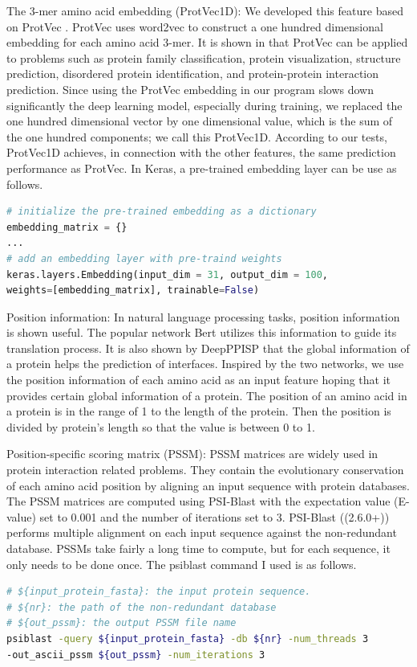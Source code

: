 The 3-mer amino acid embedding (ProtVec1D): We developed this feature based on ProtVec \cite{asgari2015continuous}. ProtVec uses word2vec \cite{mikolov2013distributed} to construct a one hundred dimensional embedding for each amino acid 3-mer. It is shown in \cite{asgari2015continuous} that ProtVec can be applied to problems such as protein family classification, protein visualization, structure prediction, disordered protein identification, and protein-protein interaction prediction. Since using the ProtVec embedding in our program slows down significantly the deep learning model, especially during training, we replaced the one hundred dimensional vector by one dimensional value, which is the sum of the one hundred components; we call this ProtVec1D. According to our tests, ProtVec1D achieves, in connection with the other features, the same prediction performance as ProtVec. In Keras, a pre-trained embedding layer can be use as follows.
\begin{lstlisting}[language=python,frame=single]
# initialize the pre-trained embedding as a dictionary
embedding_matrix = {}
...
# add an embedding layer with pre-traind weights
keras.layers.Embedding(input_dim = 31, output_dim = 100,
weights=[embedding_matrix], trainable=False)
\end{lstlisting}

Position information: In natural language processing tasks, position information is shown useful. The popular network Bert \cite{devlin2018bert} utilizes this information to guide its translation process. It is also shown by DeepPPISP \cite{zeng2019protein} that the global information of a protein helps the prediction of interfaces. Inspired by the two networks, we use the position information of each amino acid as an input feature hoping that it provides certain global information of a protein. The position of an amino acid in a protein is in the range of 1 to the length of the protein. Then the position is divided by protein's length so that the value is between 0 to 1.

Position-specific scoring matrix (PSSM): PSSM matrices are widely used in protein interaction related problems. They contain the evolutionary conservation of each amino acid position by aligning an input sequence with protein databases. The PSSM matrices are computed using PSI-Blast \cite{altschul1997gapped} with the expectation value (E-value) set to 0.001 and the number of iterations set to 3. PSI-Blast ((2.6.0+)) performs multiple alignment on each input sequence against the non-redundant database. PSSMs take fairly a long time to compute, but for each sequence, it only needs to be done once. The psiblast command I used is as follows.
\begin{lstlisting}[language=bash,frame=single]
# ${input_protein_fasta}: the input protein sequence.
# ${nr}: the path of the non-redundant database
# ${out_pssm}: the output PSSM file name
psiblast -query ${input_protein_fasta} -db ${nr} -num_threads 3
-out_ascii_pssm ${out_pssm} -num_iterations 3
\end{lstlisting}

